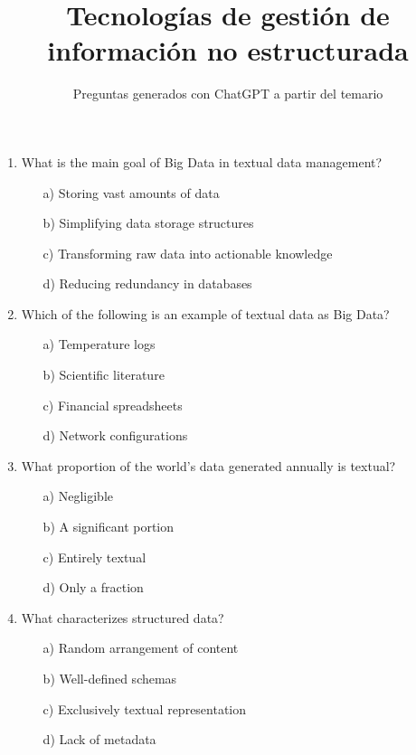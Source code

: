 \documentclass[8pt]{extarticle}
\begin{document}
\title{Tecnologías de gestión de información no estructurada}
\author{Preguntas generados con ChatGPT a partir del temario}
\date{}
\maketitle
\begin{multicols}{2}
\begin{enumerate}
\item What is the main goal of Big Data in textual data management?
\begin{itemize}
    \item[a)] Storing vast amounts of data
    \item[b)] Simplifying data storage structures
    \item[c)] Transforming raw data into actionable knowledge
    \item[d)] Reducing redundancy in databases
\end{itemize}

\item Which of the following is an example of textual data as Big Data?
\begin{itemize}
    \item[a)] Temperature logs
    \item[b)] Scientific literature
    \item[c)] Financial spreadsheets
    \item[d)] Network configurations
\end{itemize}

\item What proportion of the world's data generated annually is textual?
\begin{itemize}
    \item[a)] Negligible
    \item[b)] A significant portion
    \item[c)] Entirely textual
    \item[d)] Only a fraction
\end{itemize}

\item What characterizes structured data?
\begin{itemize}
    \item[a)] Random arrangement of content
    \item[b)] Well-defined schemas
    \item[c)] Exclusively textual representation
    \item[d)] Lack of metadata
\end{itemize}


\end{enumerate}
\end{multicols}
\end{document}
